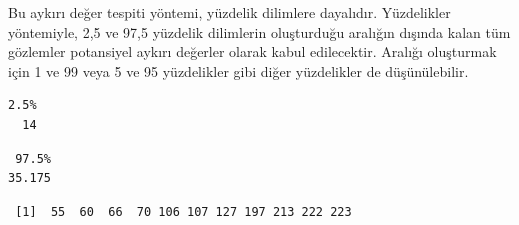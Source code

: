 \documentclass[
  letterpaper,
  DIV=11,
  numbers=noendperiod]{scrreprt}
\newenvironment{Shaded}{\begin{snugshade}}{\end{snugshade}}
\newcommand{\CommentTok}[1]{\textcolor[rgb]{0.37,0.37,0.37}{#1}}
\newcommand{\FloatTok}[1]{\textcolor[rgb]{0.68,0.00,0.00}{#1}}
\newcommand{\FunctionTok}[1]{\textcolor[rgb]{0.28,0.35,0.67}{#1}}
\newcommand{\NormalTok}[1]{\textcolor[rgb]{0.00,0.23,0.31}{#1}}
\newcommand{\OtherTok}[1]{\textcolor[rgb]{0.00,0.23,0.31}{#1}}
\newcommand{\SpecialCharTok}[1]{\textcolor[rgb]{0.37,0.37,0.37}{#1}}
\begin{document}
Bu aykırı değer tespiti yöntemi, yüzdelik dilimlere dayalıdır.
Yüzdelikler yöntemiyle, 2,5 ve 97,5 yüzdelik dilimlerin oluşturduğu
aralığın dışında kalan tüm gözlemler potansiyel aykırı değerler olarak
kabul edilecektir. Aralığı oluşturmak için 1 ve 99 veya 5 ve 95
yüzdelikler gibi diğer yüzdelikler de düşünülebilir.

\begin{Shaded}
\end{Shaded}

\begin{verbatim}
2.5% 
  14 
\end{verbatim}

\begin{Shaded}
\end{Shaded}

\begin{verbatim}
 97.5% 
35.175 
\end{verbatim}

\begin{Shaded}
\end{Shaded}

\begin{verbatim}
 [1]  55  60  66  70 106 107 127 197 213 222 223
\end{verbatim}
\end{document}
